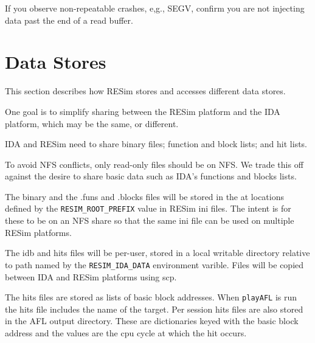 \documentclass[titlepage]{article}
\begin{document}
If you observe non-repeatable crashes, e,g., SEGV, confirm you are not injecting data past the end of a read buffer.

\section{Data Stores}
This section describes how RESim stores and accesses different data stores.

One goal is to simplify sharing between the RESim platform and the IDA platform,
which may be the same, or different.

IDA and RESim need to share binary files; function and block lists; and hit lists.

To avoid NFS conflicts, only read-only files should be on NFS. We trade this off against
the desire to share basic data such as IDA's functions and blocks lists.  

The binary and the .funs and .blocks files will be stored in the at locations defined
by the {\tt RESIM\_ROOT\_PREFIX} value in RESim ini files.  The intent is for these to
be on an NFS share so that the same ini file can be used on multiple RESim platforms.

The idb and hits files will be per-user, stored in a local writable directory relative to path 
named by the {\tt RESIM\_IDA\_DATA} environment varible.  Files will be copied between IDA
and RESim platforms using scp.  

The hits files are stored as lists of basic block addresses.  When {\tt playAFL} is run the hits
file includes the name of the target.  Per session hits files are also stored in the AFL output
directory.  These are dictionaries keyed with the basic block address and the values are the
cpu cycle at which the hit occurs.
\end{document}
